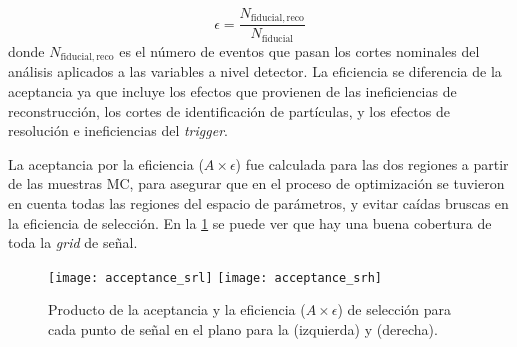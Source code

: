 \begin{equation}
  \epsilon = \frac{N_\mathrm{fiducial,reco}}{N_\mathrm{fiducial}}
\end{equation}
%
donde $N_\mathrm{fiducial,reco}$ es el número de eventos que pasan los cortes
nominales del análisis aplicados a las variables a nivel detector. La
eficiencia se diferencia de la aceptancia ya que incluye los efectos que provienen de
las ineficiencias de reconstrucción, los cortes de identificación de
partículas, y los efectos de resolución e ineficiencias del \emph{trigger}.

La aceptancia por la eficiencia ($A\times\epsilon$) fue calculada para las dos
regiones a partir de las muestras MC, para asegurar que en el proceso de
optimización se tuvieron en cuenta todas las regiones del espacio de parámetros,
y evitar caídas bruscas en la eficiencia de selección. En la
\cref{fig:atimeseff} se puede ver que hay una buena cobertura de toda la \emph{grid}
de señal.

\begin{figure}[!htb]
  \centering

  \texttt{[image: acceptance\_srl]}
  \hspace{1cm}%
  \texttt{[image: acceptance\_srh]}

  \caption{Producto de la aceptancia y la eficiencia  ($A \times \epsilon$) de selección para cada punto de señal
    en el plano {\mgmn} para la {\SRL} (izquierda) y {\SRH} (derecha).}
  \label{fig:atimeseff}
\end{figure}
